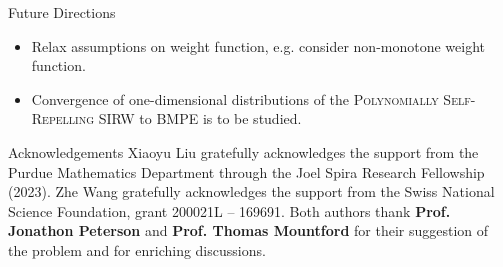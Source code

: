 \begin{mainbox}{Future Directions}
    \begin{itemize}
        \item Relax assumptions on weight function, e.g. consider non-monotone weight function.
        \item Convergence of one-dimensional distributions of the \textsc{Polynomially Self-Repelling} SIRW to BMPE is to be studied.
    \end{itemize}
\end{mainbox}

\begin{mainbox}{Acknowledgements}
    Xiaoyu Liu gratefully acknowledges the support from the Purdue Mathematics Department through the Joel Spira Research Fellowship (2023). Zhe Wang gratefully acknowledges the support from the Swiss National Science Foundation, grant 200021L -- 169691. Both authors thank \textbf{Prof. Jonathon Peterson} and \textbf{Prof. Thomas Mountford} for their suggestion of the problem and for enriching discussions.
\end{mainbox}
